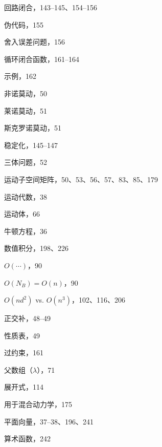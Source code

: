 \documentclass[10pt,a4paper]{book}
\theoremstyle{thmstyle} %
\theoremstyle{defstyle} %
\theoremstyle{prostyle} %
\begin{document}
回路闭合，143–145、154–156



伪代码，155



舍入误差问题，156



循环闭合函数，161–164



示例，162



非诺莫动，50



莱诺莫动，51



斯克罗诺莫动，51



稳定化，145–147



三体问题，52



运动子空间矩阵，50、53、56、57、83、85、179



运动代数，38



运动体，66



牛顿方程，36



数值积分，198、226



$O(\cdots)$，90



$O(N_B) = O(n)$，90



$O(nd^2)$ vs. $O(n^3)$，102、116、206



正交补，48–49



性质表，49



过约束，161



父数组（$\lambda$），71



展开式，114



用于混合动力学，175



平面向量，37–38、196、241



算术函数，242
\end{document}
